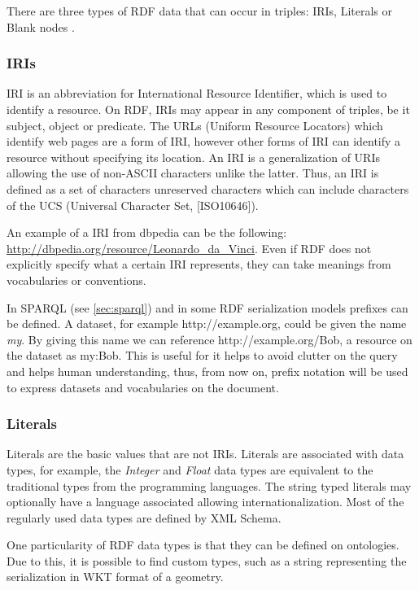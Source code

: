 There are three types of RDF data that can occur in triples: IRIs, Literals or Blank nodes \cite{rdfprimer11}.

\subsubsection*{IRIs}

IRI is an abbreviation for International Resource Identifier, which is used to identify a resource. On RDF, IRIs may appear in any component of triples, be it subject, object or predicate. The URLs (Uniform Resource Locators) which identify web pages are a form of IRI, however other forms of IRI can identify a resource without specifying its location. An IRI is a generalization of URIs allowing the use of non-ASCII characters unlike the latter. Thus, an IRI is defined as a set of characters unreserved characters which can include characters of the UCS \cite{rfc3986,rfc3987}(Universal Character Set, [ISO10646]).

An example of a IRI from dbpedia can be the following: \url{http://dbpedia.org/resource/Leonardo_da_Vinci}. Even if RDF does not explicitly specify what a certain IRI represents, they can take meanings from vocabularies or conventions.

In SPARQL (see \ref{sec:sparql}) and in some RDF serialization models prefixes can be defined. A dataset, for example http://example.org, could be given the name \textit{my}. By giving this name we can reference http://example.org/Bob, a resource on the dataset as my:Bob. This is useful for it helps to avoid clutter on the query and helps human understanding, thus, from now on, prefix notation will be used to express datasets and vocabularies on the document.

\subsubsection*{Literals}

Literals are the basic values that are not IRIs. Literals are associated with data types, for example, the \textit{Integer} and \textit{Float} data types are equivalent to the traditional types from the programming languages. The string typed literals may optionally have a language associated allowing internationalization. Most of the regularly used data types are defined by XML Schema\cite{xmlschema}.

One particularity of RDF data types is that they can be defined on ontologies. Due to this, it is possible to find custom types, such as a string representing the serialization in WKT\cite{open2011opengis} format of a geometry. 

